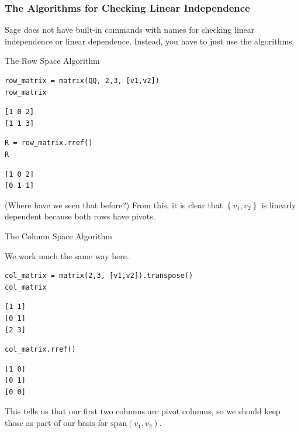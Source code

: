 \documentclass[10pt,]{book}
\theoremstyle{plain}
\theoremstyle{definition}
\numberwithin{equation}{section}
\begin{document}
\subsubsection[The Algorithms for Checking Linear Independence]{The Algorithms for Checking Linear Independence}\label{subsubsection-42}

        Sage does not have built-in commands with names for checking linear independence
        or linear dependence. Instead, you have to just use the algorithms.

        The Row Space Algorithm
        \begin{lstlisting}[style=sageinput]
row_matrix = matrix(QQ, 2,3, [v1,v2])
row_matrix
\end{lstlisting}
\begin{lstlisting}[style=sageoutput]
[1 0 2]
[1 1 3]
\end{lstlisting}

        \begin{lstlisting}[style=sageinput]
R = row_matrix.rref()
R
\end{lstlisting}
\begin{lstlisting}[style=sageoutput]
[1 0 2]
[0 1 1]
\end{lstlisting}

        
          (Where have we seen that before?) From this, it is clear that \(\left\{
          v_1, v_2 \right\}\) is linearly dependent because both rows have pivots.

      
        The Column Space Algorithm
        
          We work much the same way here.

        \begin{lstlisting}[style=sageinput]
col_matrix = matrix(2,3, [v1,v2]).transpose()
col_matrix
\end{lstlisting}
\begin{lstlisting}[style=sageoutput]
[1 1]
[0 1]
[2 3]
\end{lstlisting}

        \begin{lstlisting}[style=sageinput]
col_matrix.rref()
\end{lstlisting}
\begin{lstlisting}[style=sageoutput]
[1 0]
[0 1]
[0 0]
\end{lstlisting}

        \par

          This tells us that our first two columns are pivot columns, so we
          should
          keep those as part of our basis for
          \(\mathrm{span}\left(v_1, v_2\right)\).
\end{document}
